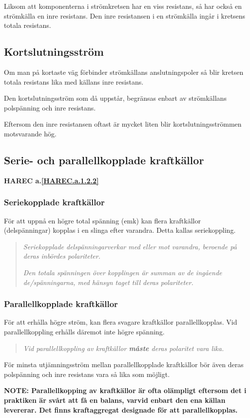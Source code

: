 Liksom att komponenterna i strömkretsen har en viss resistans, så har också en
strömkälla en inre resistans. Den inre resistansen i en strömkälla ingår i
kretsens totala resistans.

\subsection{Kortslutningsström}

Om man på kortaste väg förbinder strömkällans anslutningspoler så blir kretsen
totala resistans lika med källans inre resistans.

Den kortslutningsström som då uppstår, begränsas enbart av strömkällans
polspänning och inre resistans.

Eftersom den inre resistansen oftast är mycket liten blir kortslutningsströmmen
motsvarande hög.

\subsection{Serie- och parallellkopplade kraftkällor}
\textbf{HAREC a.\ref{HAREC.a.1.2.2}\label{myHAREC.a.1.2.2}}

\subsubsection{Seriekopplade kraftkällor}

För att uppnå en högre total spänning (emk) kan flera kraftkällor
(delspänningar) kopplas i en slinga efter varandra. Detta kallas seriekoppling.

\begin{quote}
\emph{Seriekopplade delspänningarverkar med eller mot varandra, beroende på
deras inbördes polariteter.}

\emph{Den totala spänningen över kopplingen är summan av de ingående
de/spänningarna, med hänsyn taget till deras polariteter.}
\end{quote}

\subsubsection{Parallellkopplade kraftkällor}

För att erhålla högre ström, kan flera svagare kraftkällor parallellkopplas.
Vid parallellkoppling erhålls däremot inte högre spänning.

\begin{quote}
\emph{Vid parallellkoppling av kraftkällor \textbf{måste} deras polaritet vara lika.}
\end{quote}

För minsta utjämningsström mellan parallellkopplade kraftkällor bör även deras
polspänning och inre resistans vara så lika som möjligt.

\textbf{NOTE: Parallellkopping av kraftkällor är ofta olämpligt eftersom det
i praktiken är svårt att få en balans, varvid enbart den ena källan levererar.
Det finns kraftaggregat designade för att parallellkopplas.}
